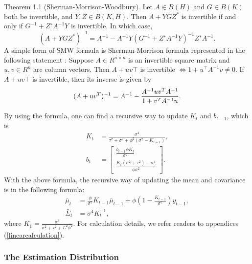 Theorem 1.1 (Sherman-Morrison-Woodbury). Let $A \in B(H)$ and $G \in B(K)$ both be invertible, and $Y, Z \in B(K, H)$. Then $A + YGZ^*$ is invertible if and only if $G^{-1} + Z^∗A^{-1}Y$ is invertible. In which case,
\begin{equation}\label{SMWformula}
(A+YGZ^*)^{-1}= A^{-1}-A^{-1}Y(G^{-1}+Z^∗A^{-1}Y)^{-1}Z^∗A^{-1}.
\end{equation}
A simple form of SMW formula is Sherman-Morrison formula represented in the following statement \cite{bartlett1951inverse}:
Suppose $A\in R^{n\times n}$ is an invertible square matrix and $u,v\in R^n$ are column vectors. Then $A+uv\top$ is invertible $\iff 1+u^\top A^{-1}v\neq 0$. If $A+uv\top$ is invertible, then its inverse is given by
\begin{equation}\label{SMformula}
(A+uv^{T})^{-1}=A^{-1}-{A^{-1}uv^{T}A^{-1} \over 1+v^{T}A^{-1}u}.
\end{equation}


By using the formula, one can find a recursive way to update $K_{t}$ and $b_{t-1}$, which is 
\begin{align}
K_{t}  &=\frac{\sigma^4}{\tau^2+\sigma^2+\phi^2(\sigma^2-K_{t-1})},\\
b_{t} &= \begin{bmatrix}
\frac{b_{t-1}\phi K_{t}}{\sigma^2} \\ \frac{K_{t}(\sigma^2+\tau^2)-\sigma^4 }{\phi\sigma^2}
\end{bmatrix}. 
\end{align}
With the above formula, the recursive way of updating the mean and covariance is in the following formula: 
\begin{align}
\bar{\mu}_{t}       & = \frac{\phi}{\sigma^2}K_{t-1}\bar{\mu}_{t-1} + \phi (1 - \frac{K_{t-1}}{\sigma^2})y_{t-1}, \\
\bar{\Sigma}_{t}  &= \sigma^4K_{t}^{-1},
\end{align}
where $K_1=\frac{\sigma^4}{\sigma^2+\tau^2+L^2\phi^2}$. For calculation details, we refer readers to appendices (\ref{linearcalculation}). 


\subsubsection*{The Estimation Distribution}

